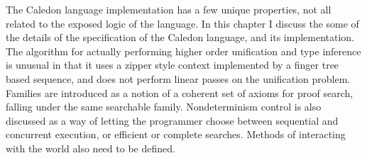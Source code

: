 The Caledon language implementation has a few unique properties, not all related to
the exposed logic of the language. In this chapter I discuss the some of the details of
the specification of the Caledon language, and its implementation. The algorithm for
actually performing higher order unification and type inference is unusual in that it
uses a zipper style context implemented by a finger tree based sequence, and does not
perform linear passes on the unification problem. Families are introduced as a notion
of a coherent set of axioms for proof search, falling under the same searchable family.
Nondeterminism control is also discussed as a way of letting the programmer choose
between sequential and concurrent execution, or efficient or complete searches. Methods
of interacting with the world also need to be defined.

